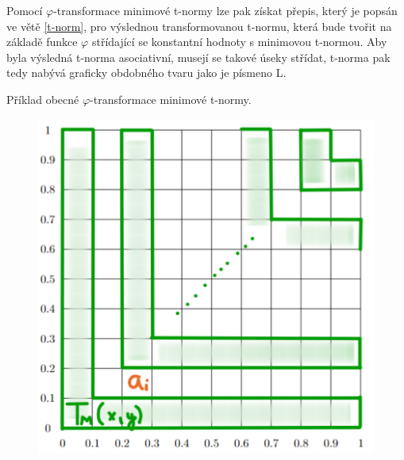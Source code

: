 Pomocí $\varphi$-transformace minimové t-normy lze pak získat přepis, který je popsán ve větě \ref{t-norm}, pro výslednou transformovanou t-normu, která bude tvořit na základě funkce $\varphi$ střídající se konstantní hodnoty s minimovou t-normou. Aby byla výsledná t-norma asociativní, musejí se takové \' useky střídat, t-norma pak tedy nabývá graficky obdobného tvaru jako je písmeno \clqq L\crqq.
\begin{graph}
    Příklad obecné $\varphi$-transformace minimové t-normy.
    \begin{figure}[H]
                \hspace{-1cm}
                \includegraphics[scale=0.6]{template-fig/t-norma.pdf}
                \centering
            \end{figure}

\end{graph}

